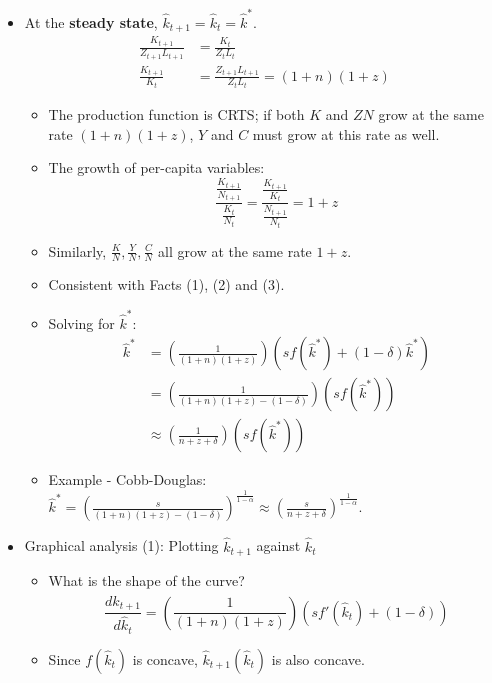 \documentclass[notitlepage]{article}
\begin{document}
\begin{itemize}
\item At the \textbf{steady state}, $\hat{k}_{t+1} = \hat{k}_{t} = \hat{k}^*$.
\begin{align*}
\frac{K_{t+1}}{Z_{t+1}L_{t+1}} &= \frac{K_{t}}{Z_{t}L_{t}} \\
\frac{K_{t+1}}{K_t} &= \frac{Z_{t+1}L_{t+1}}{Z_{t}L_{t}} = (1+n)(1+z)
\end{align*}
\begin{itemize}
\item The production function is CRTS; if both $K$ and $ZN$ grow at the same rate $(1+n)(1+z)$, $Y$ and $C$ must grow at this rate as well.
\item The growth of per-capita variables:
\[
\frac{\frac{K_{t+1}}{N_{t+1}}}{\frac{K_t}{N_t}} = \frac{\frac{K_{t+1}}{K_t}}{\frac{N_{t+1}}{N_t}} = 1+z
\]
\item Similarly, $\frac{K}{N}, \frac{Y}{N}, \frac{C}{N}$ all grow at the same rate $1+z$.
\item Consistent with Facts (1), (2) and (3).
\item Solving for $\hat{k}^*$:
\begin{align*}
\hat{k}^* &= \left(\frac{1}{(1+n)(1+z)}\right)\left(sf(\hat{k}^*) + (1-\delta)\hat{k}^*\right) \\
&= \left(\frac{1}{(1+n)(1+z)-(1-\delta)}\right) \left(sf(\hat{k}^*)\right) \\
&\approx \left(\frac{1}{n+z+\delta}\right) \left(sf(\hat{k}^*)\right)
\end{align*}
\item Example - Cobb-Douglas: $\hat{k}^* = \left(\frac{s}{(1+n)(1+z)-(1-\delta)}\right)^{\frac{1}{1-\alpha}} \approx \left(\frac{s}{n+z+\delta}\right)^{\frac{1}{1-\alpha}}$.
\end{itemize}

\item Graphical analysis (1): Plotting $\hat{k}_{t+1}$ against $\hat{k}_{t}$
\begin{itemize}
\item What is the shape of the curve?
\[
\frac{d \hat{k}_{t+1}}{d \hat{k}_{t}} = \left(\frac{1}{(1+n)(1+z)}\right) \left(sf'(\hat{k}_t) + (1-\delta)\right)
\]
\item Since $f(\hat{k}_t)$ is concave, $\hat{k}_{t+1}(\hat{k}_{t})$ is also concave.
\end{itemize}
\end{itemize}
\end{document}
